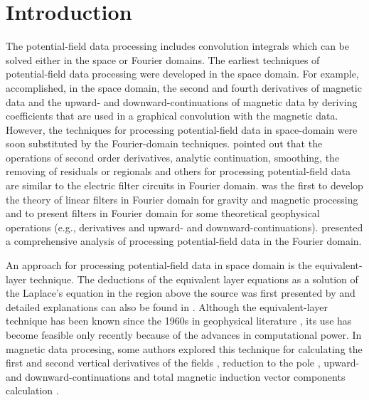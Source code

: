 \documentclass[manuscript,noblind]{geophysics}
\begin{document}
\section{Introduction}

The potential-field data processing includes convolution integrals which can be solved either in the space or Fourier domains.
The earliest techniques of potential-field data processing  were developed in the space domain.
For example, \cite{Peters1949} accomplished, in the space domain, the second and fourth derivatives of magnetic data and the upward- and downward-continuations of magnetic data by deriving coefficients that are
used in a  graphical convolution with the magnetic data.
However, the techniques for  processing potential-field data in space-domain were soon substituted by the Fourier-domain techniques. 
\cite{Dean1958} pointed out that the operations of second order derivatives, analytic continuation, smoothing, the removing of residuals or regionals and others for processing  potential-field data are similar to the electric filter circuits in Fourier domain.
\cite{Dean1958} was the first to develop the theory of linear filters in Fourier domain for gravity and magnetic processing and to present filters in Fourier domain \citep[][ see Table I, p 113]{Dean1958} 
for some theoretical geophysical operations (e.g., derivatives and upward- and downward-continuations).
\cite{GUNN1975} presented a comprehensive analysis of processing potential-field data in the Fourier domain.

An approach for processing potential-field data in space domain is the equivalent-layer technique.
The deductions of the equivalent layer equations as a solution of the Laplace's equation in the region above the source was first presented by \cite{kellogg1929} and detailed explanations can also be found in \cite{blakely1996}. 
Although the equivalent-layer technique  has been known since the 1960s in geophysical literature \citep{danes1961structure,bott1967solution,dampney1969}, its use has become feasible only recently 
because of the advances in computational power.
In magnetic data procesing, some authors explored this technique for calculating the first and second vertical derivatives of the fields \citep{emilia1973}, reduction to the pole \citep{silva1986,oliveirajr-etal2013,li2014using}, upward- and downward-continuations \citep{hansen-miyazaki1984,li-oldenburg2010} and total magnetic induction vector components calculation \citep{sun2019constrained}.
\end{document}
